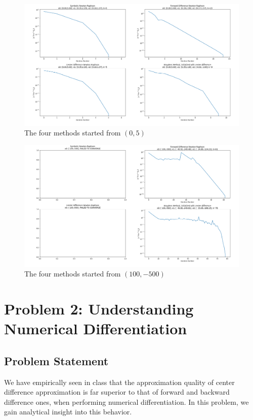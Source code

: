 \documentclass[11pt]{report}
\theoremstyle{definition}
\begin{document}
\begin{figure}
	\centering
	\includegraphics[width=1.25\textwidth, angle=90]{Figure_3.png}
	\caption{The four methods started from $(0, 5)$}
\end{figure}
\begin{figure}
	\centering
	\includegraphics[width=1.25\textwidth, angle=90]{Figure_4.png}
	\caption{The four methods started from $(100, -500)$}
\end{figure}


\newpage
\section*{Problem 2: Understanding Numerical Differentiation}
\subsection*{Problem Statement}
We have empirically seen in class that the approximation quality of center
difference approximation is far superior to that of forward and backward
difference ones, when performing numerical differentiation. In this problem, we
gain analytical insight into this behavior.
\end{document}
